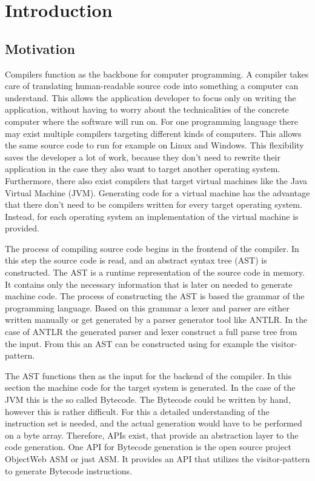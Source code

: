 \chapter{Introduction}
\label{cha:introduction}

\section{Motivation}

Compilers function as the backbone for computer programming. A compiler takes care of translating human-readable source code into something a computer can understand. This allows the application developer to focus only on writing the application, without having to worry about the technicalities of the concrete computer where the software will run on. For one programming language there may exist multiple compilers targeting different kinds of computers. This allows the same source code to run for example on Linux and Windows. This flexibility saves the developer a lot of work, because they don't need to rewrite their application in the case they also want to target another operating system. Furthermore, there also exist compilers that target virtual machines like the Java Virtual Machine (JVM). Generating code for a virtual machine has the advantage that there don't need to be compilers written for every target operating system. Instead, for each operating system an implementation of the virtual machine is provided.

The process of compiling source code begins in the frontend of the compiler. In this step the source code is read, and an abstract syntax tree (AST) is constructed. The AST is a runtime representation of the source code in memory. It contains only the necessary information that is later on needed to generate machine code. The process of constructing the AST is based the grammar of the programming language. Based on this grammar a lexer and parser are either written manually or get generated by a parser generator tool like ANTLR. In the case of ANTLR the generated parser and lexer construct a full parse tree from the input. From this an AST can be constructed using for example the visitor-pattern. 

The AST functions then as the input for the backend of the compiler. In this section the machine code for the target system is generated. In the case of the JVM this is the so called Bytecode. The Bytecode could be written by hand, however this is rather difficult. For this a detailed understanding of the instruction set is needed, and the actual generation would have to be performed on a byte array. Therefore, APIs exist, that provide an abstraction layer to the code generation. One API for Bytecode generation is the open source project ObjectWeb ASM or just ASM. It provides an API that utilizes the visitor-pattern to generate Bytecode instructions. 


